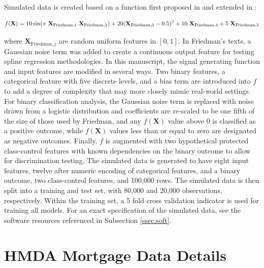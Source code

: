 \documentclass[information,article,submit,moreauthors,pdftex]{definitions/mdpi}
\begin{document}
Simulated data is created based on a function first proposed in \citet{friedman1979tree} and extended in \citet{friedman1991multivariate}:

\begin{equation}
\begin{aligned}\label{eq:sim}\small
f(\mathbf{X}) = 10\sin(\pi~\mathbf{X}_{\text{Friedman},1}~\mathbf{X}_{\text{Friedman},2}) + 20(\mathbf{X}_{\text{Friedman},3} - 0.5)^2 + 10~\mathbf{X}_{\text{Friedman},4} + 5~\mathbf{X}_{\text{Friedman},5}
\end{aligned}
\end{equation}

\noindent where $\mathbf{X}_{\text{Friedman},j}$ are random uniform features in $[0,1]$. In Friedman's texts, a Gaussian noise term was added to create a continuous output feature for testing spline regression methodologies. In this manuscript, the signal generating function and input features are modified in several ways.  Two binary features, a categorical feature with five discrete levels, and a bias term are introduced into $f$ to add a degree of complexity that may more closely mimic real-world settings. 
For binary classification analysis, the Gaussian noise term is replaced with noise drawn from a logistic distribution and coefficients are re-scaled to be one fifth of the size of those used by Friedman, and any $f(\mathbf{X})$ value above 0 is classified as a positive outcome, while $f(\mathbf{X})$ values less than or equal to zero are designated as negative outcomes.  Finally, $f$ is augmented with two hypothetical protected class-control features with known dependencies on the binary outcome to allow for discrimination testing. The simulated data is generated to have eight input features, twelve after numeric encoding of categorical features, and a binary outcome, two class-control features, and 100,000 rows. The simulated data is then split into a training and test set, with 80,000 and 20,000 observations, respectively.  Within the training set, a 5 fold cross validation indicator is used for training all models. For an exact specification of the simulated data, see the software resources referenced in Subsection \ref{ssec:soft}. 


\section{HMDA Mortgage Data Details}\label{a_sec:mort}
\end{document}
